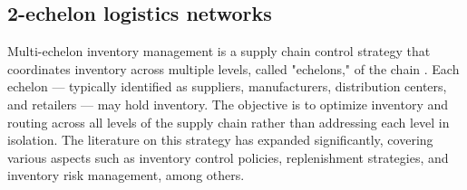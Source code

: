 \documentclass[ijoc,sglanonrev]{informs4}
\begin{document}

\subsection{2-echelon logistics networks}

Multi-echelon inventory management is a supply chain control strategy that coordinates inventory across multiple levels, called "echelons," of the chain \citep{Clark60}. Each echelon — typically identified as suppliers, manufacturers, distribution centers, and retailers — may hold inventory. The objective is to optimize inventory and routing across all levels of the supply chain rather than addressing each level in isolation. The literature on this strategy has expanded significantly, covering various aspects such as inventory control policies, replenishment strategies, and inventory risk management, among others. 
\end{document}
